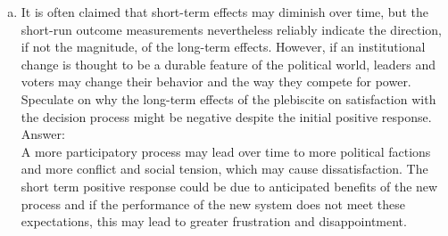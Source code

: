 \documentclass[11pt,notitlepage]{article}\usepackage[]{graphicx}\usepackage[]{color}
\begin{document}
\begin{enumerate}[a)]
\item It is often claimed that short-term effects may diminish over time, but the short-run outcome measurements nevertheless reliably indicate the direction, if not the magnitude, of the long-term effects. However, if an institutional change is thought to be a durable feature of the political world, leaders and voters may change their behavior and the way they compete for power. Speculate on why the long-term effects of the plebiscite on satisfaction with the decision process might be negative despite the initial positive response.\\
Answer:\\
A more participatory process may lead over time to more political factions and more conflict and social tension, which may cause dissatisfaction. The short term positive response could be due to anticipated benefits of the new process and if the performance of the new system does not meet these expectations, this may lead to greater frustration and disappointment. 

\end{enumerate}
\end{document}
